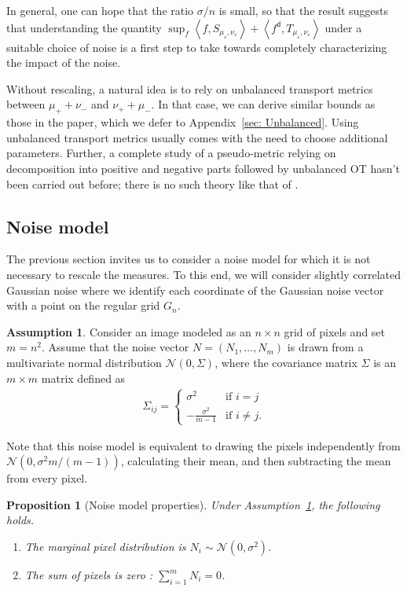 \documentclass{article}
\theoremstyle{plain}
\newtheorem{prop}[thm]{Proposition}
\theoremstyle{definition}
\newtheorem{assumption}[thm]{Assumption}
\theoremstyle{remark}
\begin{document}
In general, one can hope that the ratio $\sigma/n$ is small, so that the   result suggests that understanding the quantity
$\sup_{f} \left\langle f, S_{\mu_\varepsilon,\nu_\varepsilon}  \right\rangle + \left\langle f^\mathsf{d}, T_{\mu_\varepsilon,\nu_\varepsilon}\right \rangle$ under a suitable choice of noise is a first step to take towards completely characterizing the impact of the noise.

Without rescaling, a natural idea is to rely on unbalanced transport metrics between $\mu_+ + \nu_-$ and $\nu_+ + \mu_-$. In that case, we can derive similar bounds as those in the paper, which we defer to Appendix~\ref{sec: Unbalanced}. Using unbalanced transport metrics usually comes with the need to choose additional parameters. Further, 
a complete study of a pseudo-metric relying on decomposition into positive and negative parts followed by unbalanced OT hasn't been carried out before; there is no such theory like that of \citet{Mainini2012}.


\subsection{Noise model}

The previous section invites us to consider a noise model for which it is not necessary to rescale the measures. To this end, we will consider slightly correlated Gaussian noise where we identify each coordinate of the Gaussian noise vector with a point on the regular grid $G_n$.
\begin{assumption}
\label{assum: Noise}
Consider an image modeled as an $n \times n$ grid of pixels and set $m= n^2$. Assume that the noise vector $N = (N_1, \ldots, N_m)$ is drawn from a multivariate normal distribution $\mathcal{N}(0, \Sigma)$, where the covariance matrix $\Sigma$ is an $m \times m$ matrix defined as
\begin{align}
\Sigma_{ij} =
\begin{cases}
    \sigma^2 & \text{if } i=j \\
    -\frac{\sigma^2}{m-1} & \text{if } i \ne j.
\end{cases}
\end{align}
\end{assumption}
Note that this noise model is equivalent to drawing the pixels independently from $\mathcal{N} \left( 0, \sigma^2 m/(m-1) \right)$, calculating their mean, and then subtracting the mean from every pixel.

\begin{prop}[Noise model properties]
\label{prop: Noise model properties}
Under Assumption~\ref{assum: Noise}, the following holds.
\begin{enumerate}
    \item The marginal pixel distribution is $N_i \sim \mathcal{N}(0, \sigma^2)$.
    \item The sum of pixels is zero : $\sum_{i=1}^m N_i = 0$.
\end{enumerate}
\end{prop}
\end{document}
